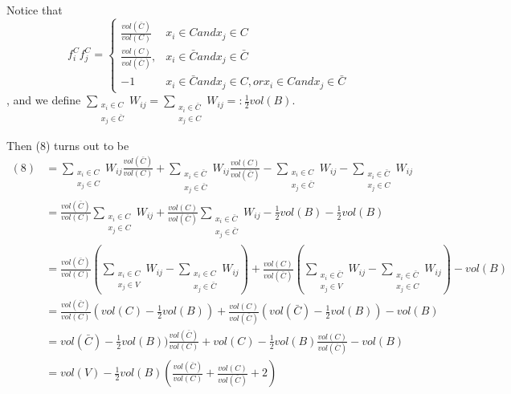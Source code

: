 \documentclass{article}
\begin{document}
Notice that\[
f^{C}_i f^{C}_j = \begin{cases} \frac{vol(\bar{C})}{vol(C)} & x_{i} \in C and x_{j} \in C \\
\frac{vol(C)}{vol(\bar{C})}, & x_{i} \in \bar{C} and x_{j} \in \bar{C}\\
-1 &  x_{i} \in \bar{C} and x_{j} \in C, or x_{i} \in C and x_{j} \in \bar{C}
\end{cases}
\], and we define $\sum_{\substack{x_i \in C \\ x_j \in \bar{C}}} W_{ij} = \sum_{\substack{x_i \in \bar{C} \\ x_j \in C}} W_{ij} =: \frac{1}{2}vol(B)$.

Then (8) turns out to be
\begin{equation}
  \begin{split}
  (8) & = \sum_{\substack{x_{i} \in C \\ x_{j} \in C}} W_{ij} \frac{vol(\bar{C})}{vol(C)}  + \sum_{\substack{x_{i} \in \bar{C} \\ x_{j} \in \bar{C}}} W_{ij} \frac{vol(C)}{vol(\bar{C})} - \sum_{\substack{x_{i} \in C \\ x_{j} \in \bar{C}}} W_{ij} - \sum_{\substack{x_{i} \in \bar{C} \\ x_{j} \in C}} W_{ij} \\
  & = \frac{vol(\bar{C})}{vol(C)} \sum_{\substack{x_{i} \in C \\ x_{j} \in C}} W_{ij} +  \frac{vol(C)}{vol(\bar{C})} \sum_{\substack{x_{i} \in \bar{C} \\ x_{j} \in \bar{C}}} W_{ij} - \frac{1}{2}vol(B) - \frac{1}{2}vol(B)\\
  & =  \frac{vol(\bar{C})}{vol(C)}(\sum_{\substack{x_{i} \in C \\ x_{j} \in V}}W_{ij} -\sum_{\substack{x_{i} \in C \\ x_{j} \in \bar{C}}}W_{ij})  +\frac{vol(C)}{vol(\bar{C})} (\sum_{\substack{x_{i} \in \bar{C} \\ x_{j} \in V}} W_{ij}- \sum_{\substack{x_{i} \in \bar{C} \\ x_{j} \in C}}W_{ij}) - vol(B)\\
  & =  \frac{vol(\bar{C})}{vol(C)}(vol(C)-\frac{1}{2}vol(B)) + \frac{vol(C)}{vol(\bar{C})}(vol(\bar{C})-\frac{1}{2}vol(B)) - vol(B)\\
  & = vol(\bar{C}) - \frac{1}{2}vol(B))\frac{vol(\bar{C})}{vol(C)} + vol(C) - \frac{1}{2}vol(B)\frac{vol(C)}{vol(\bar{C})} - vol(B)\\
  & = vol(V) - \frac{1}{2} vol(B)(\frac{vol(\bar{C})}{vol(C)}+\frac{vol(C)}{vol(\bar{C})}+2)\\

\end{split}
\end{equation}
\end{document}
